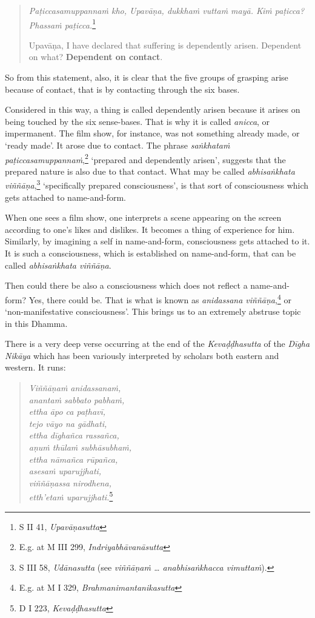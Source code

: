 \begin{quote}
\emph{Paṭiccasamuppannaṁ kho, Upavāṇa, dukkhaṁ vuttaṁ mayā. Kiṁ paṭicca? Phassaṁ paṭicca.}\footnote{S II 41, \emph{Upavāṇasutta}}

Upavāṇa, I have declared that suffering is dependently arisen. Dependent on what? \textbf{Dependent on contact}.
\end{quote}

So from this statement, also, it is clear that the five groups of grasping arise because of contact, that is by contacting through the six bases.

Considered in this way, a thing is called dependently arisen because it arises on being touched by the six sense-bases. That is why it is called \emph{anicca}, or impermanent. The film show, for instance, was not something already made, or `ready made'. It arose due to contact. The phrase \emph{saṅkhataṁ paṭiccasamuppannaṁ},\footnote{E.g. at M III 299, \emph{Indriyabhāvanāsutta}} `prepared and dependently arisen', suggests that the prepared nature is also due to that contact. What may be called \emph{abhisaṅkhata viññāṇa},\footnote{S III 58, \emph{Udānasutta} (see \emph{viññāṇaṁ \ldots{} anabhisaṅkhacca vimuttaṁ}).} `specifically prepared consciousness', is that sort of consciousness which gets attached to name-and-form.

When one sees a film show, one interprets a scene appearing on the screen according to one's likes and dislikes. It becomes a thing of experience for him. Similarly, by imagining a self in name-and-form, consciousness gets attached to it. It is such a consciousness, which is established on name-and-form, that can be called \emph{abhisaṅkhata viññāṇa}.

Then could there be also a consciousness which does not reflect a name-and-form? Yes, there could be. That is what is known as \emph{anidassana viññāṇa},\footnote{E.g. at M I 329, \emph{Brahmanimantanikasutta}} or `non-manifestative consciousness'. This brings us to an extremely abstruse topic in this Dhamma.

There is a very deep verse occurring at the end of the \emph{Kevaḍḍhasutta} of the \emph{Dīgha Nikāya} which has been variously interpreted by scholars both eastern and western. It runs:

\begin{quote}
\emph{Viññāṇaṁ anidassanaṁ,}\\
\emph{anantaṁ sabbato pabhaṁ,}\\
\emph{ettha āpo ca paṭhavī,}\\
\emph{tejo vāyo na gādhati,}\\
\emph{ettha dīghañca rassañca,}\\
\emph{aṇuṁ thūlaṁ subhāsubhaṁ,}\\
\emph{ettha nāmañca rūpañca,}\\
\emph{asesaṁ uparujjhati,}\\
\emph{viññāṇassa nirodhena,}\\
\emph{etth'etaṁ uparujjhati.}\footnote{D I 223, \emph{Kevaḍḍhasutta}}
\end{quote}

